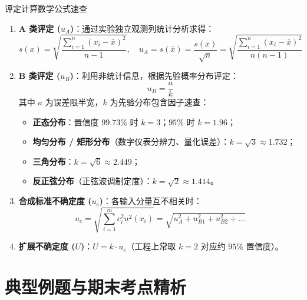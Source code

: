 \documentclass[11pt,a4paper]{ctexart}
\begin{document}
\begin{defbox}{评定计算数学公式速查}
\begin{enumerate}
    \item \textbf{A 类评定 ($u_A$)}：通过实验独立观测列统计分析求得：
    \begin{equation}
        s(x) = \sqrt{\frac{\sum_{i=1}^n (x_i - \bar{x})^2}{n-1}}, \quad u_A = s(\bar{x}) = \frac{s(x)}{\sqrt{n}} = \sqrt{\frac{\sum_{i=1}^n (x_i - \bar{x})^2}{n(n-1)}}
    \end{equation}
    \item \textbf{B 类评定 ($u_B$)}：利用非统计信息，根据先验概率分布评定：
    \begin{equation}
        u_B = \frac{a}{k}
    \end{equation}
    其中 $a$ 为误差限半宽，$k$ 为先验分布包含因子速查：
    \begin{itemize}
        \item \textbf{正态分布}：置信度 $99.73\%$ 时 $k=3$；$95\%$ 时 $k=1.96$；
        \item \textbf{均匀分布 / 矩形分布}（数字仪表分辨力、量化误差）：$k = \sqrt{3} \approx 1.732$；
        \item \textbf{三角分布}：$k = \sqrt{6} \approx 2.449$；
        \item \textbf{反正弦分布}（正弦波调制定度）：$k = \sqrt{2} \approx 1.414$。
    \end{itemize}
    \item \textbf{合成标准不确定度 ($u_c$)}：各输入分量互不相关时：
    \begin{equation}
        u_c = \sqrt{\sum_{i=1}^m c_i^2 u^2(x_i)} = \sqrt{u_A^2 + u_{B1}^2 + u_{B2}^2 + \dots}
    \end{equation}
    \item \textbf{扩展不确定度 ($U$)}：$U = k \cdot u_c$（工程上常取 $k=2$ 对应约 $95\%$ 置信度）。
\end{enumerate}
\end{defbox}

\section{典型例题与期末考点精析}
\end{document}
